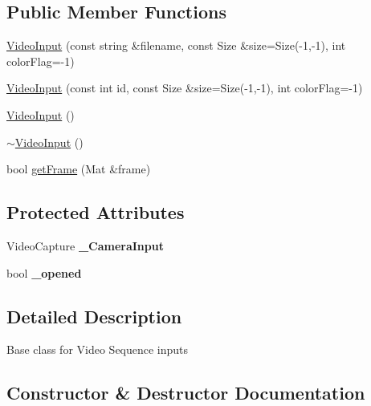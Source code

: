 \subsection*{Public Member Functions}
\begin{DoxyCompactItemize}
\item 
\hyperlink{classviva_1_1_video_input_a37aabc4cd8ebc70dfa9b49bcb7a5d330}{Video\+Input} (const string \&filename, const Size \&size=Size(-\/1,-\/1), int color\+Flag=-\/1)
\item 
\hyperlink{classviva_1_1_video_input_adb9f341fb5b01b81b34f6f7f4f1eaa80}{Video\+Input} (const int id, const Size \&size=Size(-\/1,-\/1), int color\+Flag=-\/1)
\item 
\hyperlink{classviva_1_1_video_input_a88f06259f63094534518f32397024cfb}{Video\+Input} ()
\item 
\hyperlink{classviva_1_1_video_input_aece2200729baa8cef7db668583fb6470}{$\sim$\+Video\+Input} ()
\item 
bool \hyperlink{classviva_1_1_video_input_ab4819eb95ad41ba9a59536f60eefa5a9}{get\+Frame} (Mat \&frame)
\end{DoxyCompactItemize}
\subsection*{Protected Attributes}
\begin{DoxyCompactItemize}
\item 
Video\+Capture {\bfseries \+\_\+\+Camera\+Input}\hypertarget{classviva_1_1_video_input_a3b7196ebc0f6009f4ad63be661a00fd3}{}\label{classviva_1_1_video_input_a3b7196ebc0f6009f4ad63be661a00fd3}

\item 
bool {\bfseries \+\_\+opened}\hypertarget{classviva_1_1_video_input_ae98b3866cd376d0dfaf80b191c57db30}{}\label{classviva_1_1_video_input_ae98b3866cd376d0dfaf80b191c57db30}

\end{DoxyCompactItemize}


\subsection{Detailed Description}
Base class for Video Sequence inputs 

\subsection{Constructor \& Destructor Documentation}

